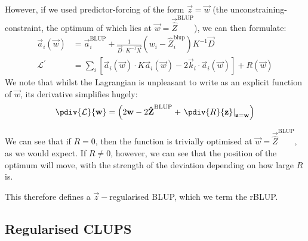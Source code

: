\documentclass[]{article}
\begin{document}
			However, if we used predictor-forcing of the form $\vec{z} = \vec{w}$ (the unconstraining-constraint, the optimum of which lies at $\vec{w} = \vec{\hat{Z}}^\text{BLUP}$), we can then formulate:
			\begin{align}
				\vec{a}_i(\vec{w}) & =  \vec{a}_i^\text{BLUP} + \frac{1}{\vec{D}\cdot K^{-1} \vec{X}} \left(w_i - \hat{Z}^\text{blup}_i \right) K^{-1} \vec{D}
				\\
				\mathcal{L}^\prime & = \sum_i \left[ \vec{a}_i(\vec{w}) \cdot K \vec{a}_i(\vec{w})- 2 \vec{k}_i \cdot\vec{a}_i(\vec{w})\right] + R(\vec{w}) 
			\end{align}
			We note that whilst the Lagrangian is unpleasant to write as an explicit function of $\vec{w}$, its derivative simplifies hugely:
			\begin{equation}
				\pdiv{\mathcal{L}}{\vec{w}} =  \left( 2\vec{w} - 2\vec{\hat{Z}}^\text{BLUP}+ \left.\pdiv{R}{\vec{z}}\right|_{\vec{z} = \vec{w}}\right)
			\end{equation}
		
			We can see that if $R = 0$, then the function is trivially optimised at $\vec{w}=\vec{\hat{Z}}^\text{BLUP}$, as we would expect. If $R \neq 0$, however, we can see that the position of the optimum will move, with the strength of the deviation depending on how large $R$ is.

			This therefore defines a $\vec{z}-$regularised BLUP, which we term the rBLUP.

		\subsection{Regularised CLUPS}
\end{document}
